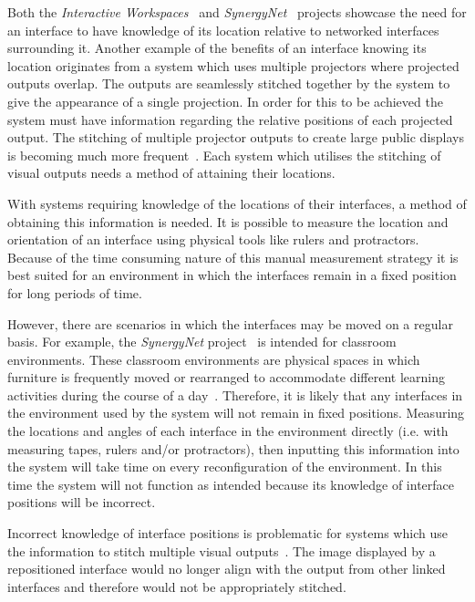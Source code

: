 \documentclass{bmcart}
\begin{document}
Both the {\emph{Interactive Workspaces}}~\cite{Johanson2002} and {\emph{SynergyNet}}~\cite{Burd2009} projects showcase the need for an interface to have knowledge of its location relative to networked interfaces surrounding it.
Another example of the benefits of an interface knowing its location originates from a system which uses multiple projectors where projected outputs overlap.
The outputs are seamlessly stitched together by the system to give the appearance of a single projection.
In order for this to be achieved the system must have information regarding the relative positions of each projected output.
The stitching of multiple projector outputs to create large public displays is becoming much more frequent~\cite{Jones2011}.
Each system which utilises the stitching of visual outputs needs a method of attaining their locations.

With systems requiring knowledge of the locations of their interfaces, a method of obtaining this information is needed.
It is possible to measure the location and orientation of an interface using physical tools like rulers and protractors. 
Because of the time consuming nature of this manual measurement strategy it is best suited for an environment in which the interfaces remain in a fixed position for long periods of time.

However, there are scenarios in which the interfaces may be moved on a regular basis.
For example, the {\emph{SynergyNet}} project~\cite{Burd2009} is intended for classroom environments.
These classroom environments are physical spaces in which furniture is frequently moved or rearranged to accommodate different learning activities during the course of a day~\cite{Tiburcio2005}.
Therefore, it is likely that any interfaces in the environment used by the system will not remain in fixed positions.
Measuring the locations and angles of each interface in the environment directly (i.e. with measuring tapes, rulers and/or protractors), then inputting this information into the system will take time on every reconfiguration of the environment.
In this time the system will not function as intended because its knowledge of interface positions will be incorrect.

Incorrect knowledge of interface positions is problematic for systems which use the information to stitch multiple visual outputs~\cite{Dietz2004,Jones2011}.
The image displayed by a repositioned interface would no longer align with the output from other linked interfaces and therefore would not be appropriately stitched.
\end{document}
